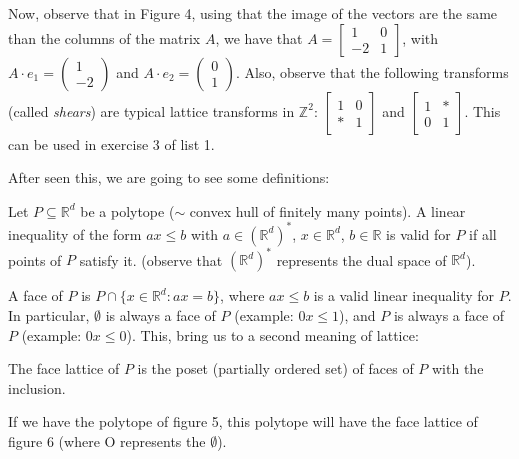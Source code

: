   Now, observe that in Figure 4, using that the image of the vectors
  are the same than the columns of the matrix $A$, we have that $A =
  \left[ \begin{smallmatrix} 1 & 0 \\ -2 & 1 \end{smallmatrix}
  \right]$, with $A \cdot e_{1} = \left( \begin{smallmatrix} 1 \\ -
      2 \end{smallmatrix}
  \right)$ and $A \cdot e_{2} = \left( \begin{smallmatrix} 0 \\
      1 \end{smallmatrix} \right)$.  Also, observe that the following
  transforms (called \emph{shears}) are typical lattice transforms in
  $\mathbb{Z}^{2}$: $\left[ \begin{smallmatrix} 1 & 0 \\ * &
      1 \end{smallmatrix} \right]$ and $\left[ \begin{smallmatrix} 1 &
      * \\ 0 & 1 \end{smallmatrix} \right]$. This can be used in
  exercise 3 of list 1.

After seen this, we are going to see some definitions:

Let $P \subseteq \mathbb{R}^{d}$ be a polytope ($\sim$ convex hull of
finitely many points). A linear inequality of the form $ax \leq b$
with $a \in (\mathbb{R}^{d})^{*}$, $x \in \mathbb{R}^{d}$, $b \in
\mathbb{R}$ is valid for $P$ if all points of $P$ satisfy it. (observe
that $(\mathbb{R}^{d})^{*}$ represents the dual space of
$\mathbb{R}^{d}$).

A face of $P$ is $P \cap \lbrace x \in \mathbb{R}^{d} : ax = b
\rbrace$, where $ax \leqslant b$ is a valid linear inequality for
$P$. In particular, $\emptyset$ is always a face of $P$ (example: $0x
\leqslant 1$), and $P$ is always a face of $P$ (example: $0x \leqslant
0$). This, bring us to a second meaning of lattice:

The face lattice of $P$ is the poset (partially ordered set) of faces
of $P$ with the inclusion.

\begin{example} If we have the polytope of figure 5, this polytope
  will have the face lattice of figure 6 (where O represents the
  $\emptyset$).
\end{example}

